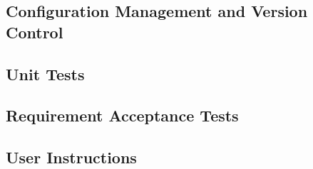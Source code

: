 \documentclass[12pt, a4]{report}
\begin{document}
	
	\pagebreak
	\subsection{Configuration Management and Version Control}
	
	\subsection{Unit Tests}
		
	\subsection{Requirement Acceptance Tests}

	\subsection{User Instructions}



	
\end{document}
